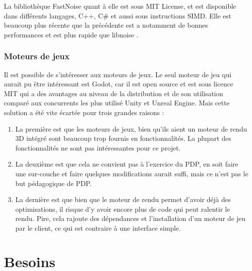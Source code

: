 \documentclass[a4paper]{article}
\begin{document}
    
    La bibliothèque FastNoise quant à elle est sous MIT License, et est disponible dans différents langages, C++, C\# et aussi sous instructions SIMD. Elle est beaucoup plus récente que la précédente est a notamment de bonnes performances et est plus rapide que libnoise \protect\footnotemark.\\
    
    
 \subsubsection{Moteurs de jeux}

    Il est possible de s'intéresser aux moteurs de jeux. Le seul moteur de jeu qui aurait pu être intéressant est Godot, car il est open source et est sous licence MIT qui a des avantages au niveau de la distribution et de son utilisation comparé aux concurrents les plus utilisé Unity et Unreal Engine. Mais cette solution a été vite écartée pour trois grandes raisons : 
    \begin{enumerate}
        \item  La première est que les moteurs de jeux, bien qu'ils aient un moteur de rendu 3D intégré sont beaucoup trop fournis en fonctionnalités. La plupart des fonctionnalités ne sont pas intéressantes pour ce projet. 
        
        \item La deuxième est que cela ne convient pas à l'exercice du PDP, en soit faire une sur-couche et faire quelques modifications aurait suffi, mais ce n'est pas le but pédagogique de PDP.
        
        \item  La dernière est que bien que le moteur de rendu permet d'avoir déjà des optimisations, il risque d'y avoir encore plus de code qui peut ralentir le rendu. Pire, cela rajoute des dépendances et l'installation d'un moteur de jeu par le client, ce qui est contraire à une interface simple.
    \end{enumerate}

\section{Besoins}
\end{document}
